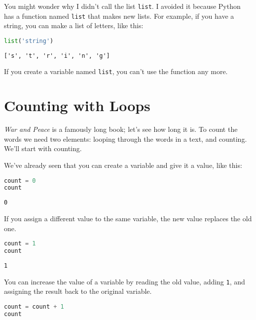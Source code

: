 You might wonder why I didn't call the list
\passthrough{\lstinline!list!}. I avoided it because Python has a
function named \passthrough{\lstinline!list!} that makes new lists. For
example, if you have a string, you can make a list of letters, like
this:

\begin{lstlisting}[language=Python,style=source]
list('string')
\end{lstlisting}

\begin{lstlisting}[style=output]
['s', 't', 'r', 'i', 'n', 'g']
\end{lstlisting}

If you create a variable named \passthrough{\lstinline!list!}, you can't
use the function any more.

\hypertarget{counting-with-loops}{%
\section{Counting with Loops}\label{counting-with-loops}}

\emph{War and Peace} is a famously long book; let's see how long it is.
To count the words we need two elements: looping through the words in a
text, and counting. We'll start with counting.

We've already seen that you can create a variable and give it a value,
like this:

\begin{lstlisting}[language=Python,style=source]
count = 0
count
\end{lstlisting}

\begin{lstlisting}[style=output]
0
\end{lstlisting}

If you assign a different value to the same variable, the new value
replaces the old one.

\begin{lstlisting}[language=Python,style=source]
count = 1
count
\end{lstlisting}

\begin{lstlisting}[style=output]
1
\end{lstlisting}

You can increase the value of a variable by reading the old value,
adding \passthrough{\lstinline!1!}, and assigning the result back to the
original variable.

\begin{lstlisting}[language=Python,style=source]
count = count + 1
count
\end{lstlisting}

